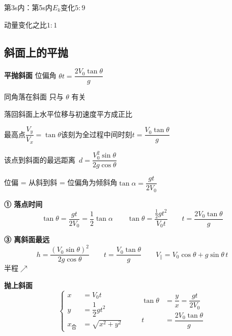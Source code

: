\begin{problem}
\begin{solution}
第3s内：第5s内\quad $E_k$变化\quad $5:9$ %

动量变化之比\quad $1:1$
\end{solution}
\end{problem}

\subsection{斜面上的平抛}
\textbf{平抛斜面}
位偏角 $\theta$\quad $t=\dfrac{2V_0\tan\theta}{g}$

同角落在斜面 只与 $\theta$ 有关

落回斜面上水平位移与初速度平方成正比

最高点\quad $\dfrac{V_y}{V_x}=\tan\theta$\quad 该刻为全过程中间时刻\quad $t=\dfrac{V_0\tan\theta}{g}$

该点到斜面的最远距离\ $d=\dfrac{V_0^2\sin\theta}{2g\cos\theta}$ %

\noindent 位偏 = 从斜到斜 = 位偏角为倾斜角\qquad $\tan\alpha=\dfrac{gt}{2V_0}$

\textbf{① 落点时间}
\[
\tan\theta=\frac{gt}{2V_0}=\frac12\tan\alpha\qquad
\tan\theta=\frac{\frac12gt^2}{V_0t}\qquad
t=\frac{2V_0\tan\theta}{g}
\]

\textbf{③ 离斜面最远}
\[
h=\frac{(V_0\sin\theta)^2}{2g\cos\theta}\qquad
t=\frac{V_0\tan\theta}{g}\qquad
V_{\parallel}=V_0\cos\theta+g\sin\theta\,t
\]
\noindent 半程$\nearrow$%

\textbf{抛上斜面}
\[
\left\{\begin{aligned}
x&=V_0t\\
y&=\dfrac12gt^2\\
x_{\text{合}}&=\sqrt{x^2+y^2}
\end{aligned}\right.
\qquad
\begin{aligned}
\tan\theta&=\dfrac{y}{x}=\dfrac{gt}{2V_0}\\
t&=\dfrac{2V_0\tan\theta}{g}
\end{aligned}
\]

